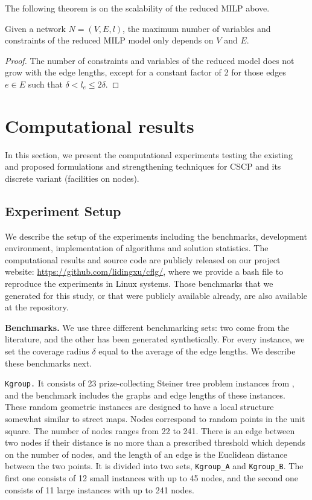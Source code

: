The following theorem is on the scalability of the reduced MILP above.
\begin{theorem}
Given a network %
$N=(V,E,l)$, the maximum number of variables and constraints of the reduced MILP model only depends on $V$ and $E$.%
\end{theorem}
\begin{proof}
The number of constraints and variables of the reduced model does not grow with the edge lengths, except for a constant factor of 2 for those edges $e\in E$ such that $\delta < l_e \leq 2\delta$.
\end{proof}

\section{Computational results}\label{sec:compu}

In this section, we present the computational experiments testing the existing and proposed formulations and strengthening techniques for  CSCP and its discrete variant (facilities on nodes).

\subsection{Experiment Setup}
We describe the setup of the experiments including the benchmarks, development environment, implementation of algorithms and solution statistics. The  computational results and source code are publicly released on our project website: \href{https://github.com/lidingxu/cflg/}{https://github.com/lidingxu/cflg/}, where we provide a bash file to reproduce the experiments in Linux systems. Those benchmarks that we generated for this study, or that were publicly available already, are also available at the repository. %

\textbf{Benchmarks.}
We use three different benchmarking sets: two come from the literature, and the other has been generated synthetically. For every instance, we set the coverage radius $\delta$ equal to the  average of the edge lengths. We describe these benchmarks next.

\texttt{Kgroup.} It consists of 23 prize-collecting Steiner tree problem instances from \cite{Ljubic2006}, and the benchmark includes the graphs and edge lengths of these instances. These random geometric instances are designed to have a local structure somewhat similar to street maps. Nodes correspond to random points in the unit square. The number of nodes ranges from 22 to 241. There
is an edge between two nodes if their distance is no more than a prescribed threshold which depends on the number of nodes, and the length of an edge is the Euclidean distance between the two points. It is divided into two sets, \texttt{Kgroup\_A} and  \texttt{Kgroup\_B}. The first one consists of 12 small instances with up to 45 nodes, and the second one consists of 11 large instances with up to 241 nodes.  

